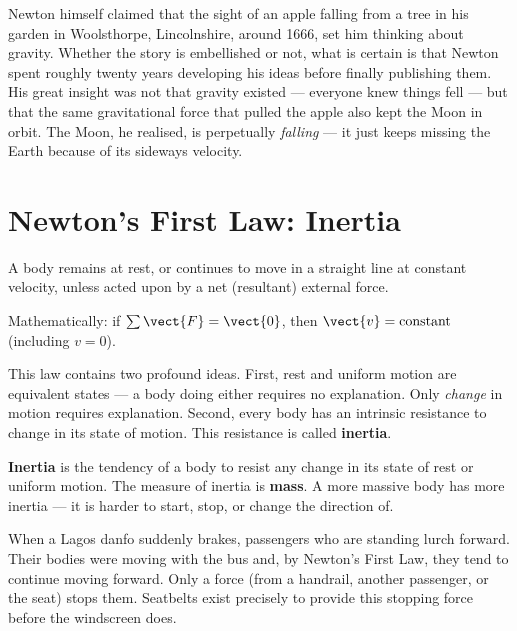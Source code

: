 \begin{historybox}
Newton himself claimed that the sight of an apple falling
from a tree in his garden in Woolsthorpe, Lincolnshire,
around 1666, set him thinking about gravity. Whether the
story is embellished or not, what is certain is that
Newton spent roughly twenty years developing his ideas
before finally publishing them. His great insight was not
that gravity existed --- everyone knew things fell --- but
that the same gravitational force that pulled the apple
also kept the Moon in orbit. The Moon, he realised, is
perpetually \textit{falling} --- it just keeps missing
the Earth because of its sideways velocity.
\end{historybox}

\section{Newton's First Law: Inertia}

\begin{lawbox}
A body remains at rest, or continues to move in a
straight line at constant velocity, unless acted upon
by a net (resultant) external force.

Mathematically: if $\sum\vect{F} = \vect{0}$,
then $\vect{v} = \text{constant}$ (including $v = 0$).
\end{lawbox}

This law contains two profound ideas. First, rest and
uniform motion are equivalent states --- a body doing
either requires no explanation. Only \textit{change}
in motion requires explanation. Second, every body has
an intrinsic resistance to change in its state of motion.
This resistance is called \textbf{inertia}.

\begin{definitionbox}[Inertia]
\textbf{Inertia} is the tendency of a body to resist
any change in its state of rest or uniform motion.
The measure of inertia is \textbf{mass}. A more massive
body has more inertia --- it is harder to start, stop,
or change the direction of.
\end{definitionbox}

\begin{realworldbox}
When a Lagos danfo suddenly brakes, passengers who are
standing lurch forward. Their bodies were moving with
the bus and, by Newton's First Law, they tend to
continue moving forward. Only a force (from a handrail,
another passenger, or the seat) stops them. Seatbelts
exist precisely to provide this stopping force before
the windscreen does.
\end{realworldbox}

